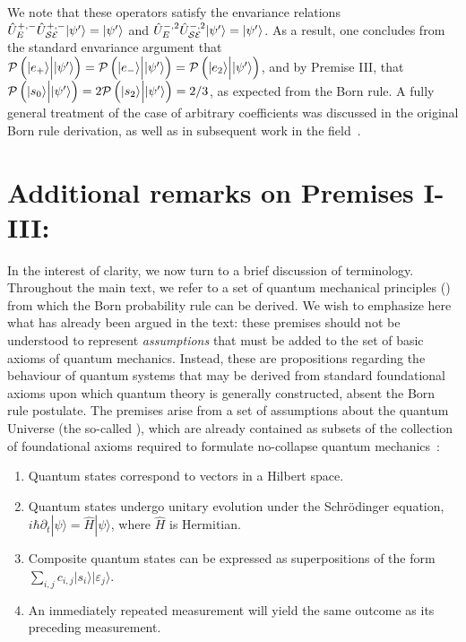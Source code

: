 \documentclass[12pt]{iopart}
\begin{document}
%
We note that these operators satisfy the envariance relations $\hat{U}^{+,-}_{E}\hat{U}^{+,-}_{\cal SE}|\psi'\rangle=|\psi'\rangle$ and $\hat{U}^{-,2}_{E}\hat{U}^{-,2}_{\cal SE}|\psi'\rangle=|\psi'\rangle$. As a result, one concludes from the standard envariance argument that ${\cal P}\left(|e_+\rangle \Big{|} |\psi'\rangle\right)={\cal P}\left(|e_-\rangle \Big{|} |\psi'\rangle\right)={\cal P}\left(|e_2\rangle \Big{|} |\psi'\rangle\right)$, and by Premise III, that ${\cal P}\left(|s_0\rangle \Big{|} |\psi'\rangle\right)=2 {\cal P}\left(|s_2\rangle \Big{|} |\psi'\rangle\right)=2/3$, as expected from the Born rule. A fully general treatment of the case of arbitrary coefficients was discussed in the original Born rule derivation, as well as in subsequent work in the field~\cite{zurek:03a,zurek:11}. 

\section{Additional remarks on Premises I-III:}
In the interest of clarity, we now turn to a brief discussion of terminology. Throughout the main text, we refer to a set of quantum mechanical principles () from which the Born probability rule can be derived. We wish to emphasize here what has already been argued in the text: these premises should not be understood to represent \textit{assumptions} that must be added to the set of basic  axioms of quantum mechanics. Instead, these are propositions regarding the behaviour of quantum systems that may be derived from standard foundational axioms upon which quantum theory is generally constructed, absent the Born rule postulate. The premises arise from a set of assumptions about the quantum Universe (the so-called ), which are already contained as subsets of the collection of foundational axioms required to formulate no-collapse quantum mechanics~\cite{zurek:14,zurek:05}:

\begin{enumerate}
\item Quantum states correspond to vectors in a Hilbert space. 
\item Quantum states undergo unitary evolution under the Schr\"odinger equation, $i\hbar\partial_t|\psi\rangle=\hat{H}|\psi\rangle$, where $\hat{H}$ is Hermitian.
\item Composite quantum states can be expressed as superpositions of the form $\sum_{i,j}c_{i,j}|s_i\rangle|\varepsilon_j\rangle$.
\item An immediately repeated measurement will yield the same outcome as its preceding measurement.
\end{enumerate}
\end{document}

